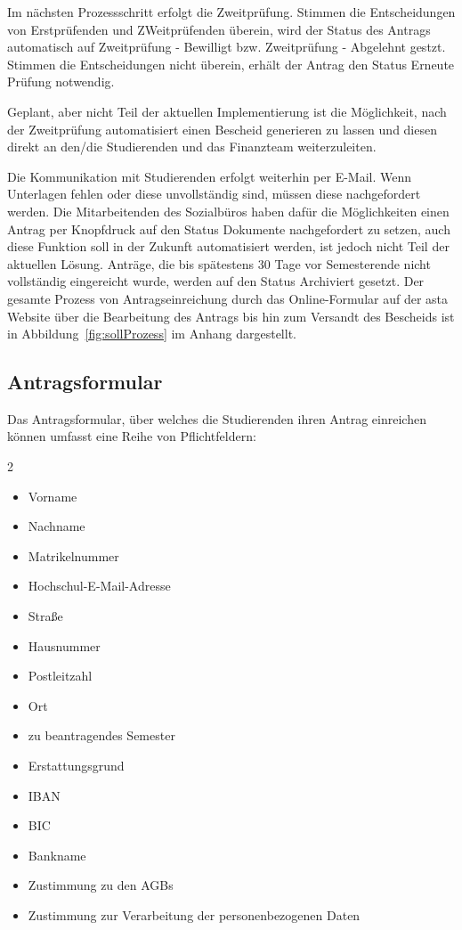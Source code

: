 Im nächsten Prozessschritt erfolgt die Zweitprüfung. Stimmen die Entscheidungen von Erstprüfenden und ZWeitprüfenden überein, wird der Status des Antrags automatisch auf \glqq{}Zweitprüfung - Bewilligt\grqq{} bzw. \glqq{}Zweitprüfung - Abgelehnt\grqq{} gestzt. Stimmen die Entscheidungen nicht überein, erhält der Antrag den Status \glqq{}Erneute Prüfung notwendig\grqq{}. 

Geplant, aber nicht Teil der aktuellen Implementierung ist die Möglichkeit, nach der Zweitprüfung automatisiert einen Bescheid generieren zu lassen und diesen direkt an den/die Studierenden und das Finanzteam weiterzuleiten. 

Die Kommunikation mit Studierenden erfolgt weiterhin per E-Mail. Wenn Unterlagen fehlen oder diese unvollständig sind, müssen diese nachgefordert werden. Die Mitarbeitenden des Sozialbüros haben dafür die Möglichkeiten einen Antrag per Knopfdruck auf den Status \glqq{}Dokumente nachgefordert\grqq{} zu setzen, auch diese Funktion soll in der Zukunft automatisiert werden, ist jedoch nicht Teil der aktuellen Lösung. Anträge, die bis spätestens 30 Tage vor Semesterende nicht vollständig eingereicht wurde, werden auf den Status \glqq{}Archiviert\grqq{} gesetzt. Der gesamte Prozess von Antragseinreichung durch das Online-Formular auf der \gls{asta} Website über die Bearbeitung des Antrags bis hin zum Versandt des Bescheids ist in Abbildung~\ref{fig:sollProzess} im Anhang dargestellt.

\subsection{Antragsformular}\label{sec:Antragsformular_entwurf}
Das Antragsformular, über welches die Studierenden ihren Antrag einreichen können umfasst eine Reihe von Pflichtfeldern: 
\begin{multicols}{2}
\begin{itemize}[noitemsep, topsep=4pt]
    \item Vorname
    \item Nachname
    \item Matrikelnummer
    \item Hochschul-E-Mail-Adresse
    \item Straße
    \item Hausnummer
    \item Postleitzahl 
    \item Ort 
    \item zu beantragendes Semester
    \item Erstattungsgrund
    \item IBAN 
    \item BIC 
    \item Bankname
    \item Zustimmung zu den AGBs 
    \item Zustimmung zur Verarbeitung der personenbezogenen Daten
\end{itemize}
\end{multicols}

